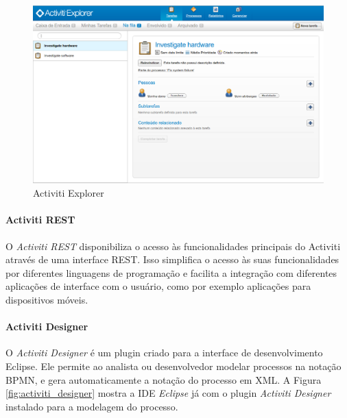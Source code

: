 \begin{figure}[H]
\centering
\includegraphics[width=1\textwidth]{imagens/activiti_explorer.png}
\caption{Activiti Explorer}
\label{fig:activiti_explorer}
\end{figure}

\paragraph{Activiti REST}\label{sec:automatizacao_processos-gestao_processos_activiti_rest}

O \textit{Activiti REST} disponibiliza o acesso às funcionalidades principais do Activiti através de uma interface REST. Isso simplifica o acesso às suas funcionalidades por diferentes linguagens de programação e facilita a integração com diferentes aplicações de interface com o usuário, como por exemplo aplicações para dispositivos móveis.

\paragraph{Activiti Designer}\label{sec:automatizacao_processos-gestao_processos_activiti_designer}

O \textit{Activiti Designer} é um plugin criado para a interface de desenvolvimento Eclipse. Ele permite ao analista ou desenvolvedor modelar processos na notação BPMN, e gera automaticamente a notação do processo em XML. A Figura \ref{fig:activiti_designer} mostra a IDE\cite{ide} \textit{Eclipse} já com o plugin \textit{Activiti Designer} instalado para a modelagem do processo.

